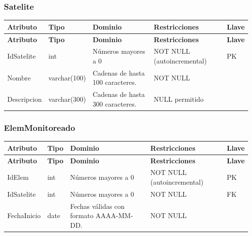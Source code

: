 \subsubsection*{Satelite}

\begin{longtable}{p{2.2cm} p{2.2cm} p{5.8cm} p{4.2cm} p{1.5cm}}
\toprule
\textbf{Atributo} & \textbf{Tipo} & \textbf{Dominio} & \textbf{Restricciones} & \textbf{Llave} \\
\midrule
\endfirsthead

\toprule
\textbf{Atributo} & \textbf{Tipo} & \textbf{Dominio} & \textbf{Restricciones} & \textbf{Llave} \\
\midrule
\endhead

\bottomrule
\endfoot


IdSatelite
& int
& Números mayores a 0
& NOT NULL (autoincremental)
& PK \\

Nombre
& varchar(100)
& Cadenas de hasta 100 caracteres.
& NOT NULL
&  \\

Descripcion
& varchar(300)
& Cadenas de hasta 300 caracteres.
& NULL permitido
&  \\

\end{longtable}


\subsubsection*{ElemMonitoreado}

\begin{longtable}{p{2.2cm} p{2.2cm} p{5.8cm} p{4.2cm} p{1.5cm}}
\toprule
\textbf{Atributo} & \textbf{Tipo} & \textbf{Dominio} & \textbf{Restricciones} & \textbf{Llave} \\
\midrule
\endfirsthead

\toprule
\textbf{Atributo} & \textbf{Tipo} & \textbf{Dominio} & \textbf{Restricciones} & \textbf{Llave} \\
\midrule
\endhead

\bottomrule
\endfoot


IdElem
& int
& Números mayores a 0
& NOT NULL (autoincremental)
& PK \\

IdSatelite
& int
& Números mayores a 0
& NOT NULL
& FK \\

FechaInicio
& date
& Fechas válidas con formato AAAA-MM-DD.
& NOT NULL
&  \\

\end{longtable}


